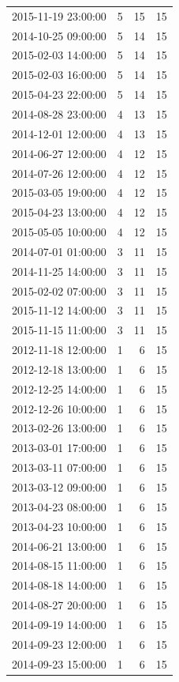 \begin{tabular}{lrrr}
2015-11-19 23:00:00 & 5 & 15 & 15 \\
2014-10-25 09:00:00 & 5 & 14 & 15 \\
2015-02-03 14:00:00 & 5 & 14 & 15 \\
2015-02-03 16:00:00 & 5 & 14 & 15 \\
2015-04-23 22:00:00 & 5 & 14 & 15 \\
2014-08-28 23:00:00 & 4 & 13 & 15 \\
2014-12-01 12:00:00 & 4 & 13 & 15 \\
2014-06-27 12:00:00 & 4 & 12 & 15 \\
2014-07-26 12:00:00 & 4 & 12 & 15 \\
2015-03-05 19:00:00 & 4 & 12 & 15 \\
2015-04-23 13:00:00 & 4 & 12 & 15 \\
2015-05-05 10:00:00 & 4 & 12 & 15 \\
2014-07-01 01:00:00 & 3 & 11 & 15 \\
2014-11-25 14:00:00 & 3 & 11 & 15 \\
2015-02-02 07:00:00 & 3 & 11 & 15 \\
2015-11-12 14:00:00 & 3 & 11 & 15 \\
2015-11-15 11:00:00 & 3 & 11 & 15 \\
2012-11-18 12:00:00 & 1 & 6 & 15 \\
2012-12-18 13:00:00 & 1 & 6 & 15 \\
2012-12-25 14:00:00 & 1 & 6 & 15 \\
2012-12-26 10:00:00 & 1 & 6 & 15 \\
2013-02-26 13:00:00 & 1 & 6 & 15 \\
2013-03-01 17:00:00 & 1 & 6 & 15 \\
2013-03-11 07:00:00 & 1 & 6 & 15 \\
2013-03-12 09:00:00 & 1 & 6 & 15 \\
2013-04-23 08:00:00 & 1 & 6 & 15 \\
2013-04-23 10:00:00 & 1 & 6 & 15 \\
2014-06-21 13:00:00 & 1 & 6 & 15 \\
2014-08-15 11:00:00 & 1 & 6 & 15 \\
2014-08-18 14:00:00 & 1 & 6 & 15 \\
2014-08-27 20:00:00 & 1 & 6 & 15 \\
2014-09-19 14:00:00 & 1 & 6 & 15 \\
2014-09-23 12:00:00 & 1 & 6 & 15 \\
2014-09-23 15:00:00 & 1 & 6 & 15 \\

\end{tabular}
